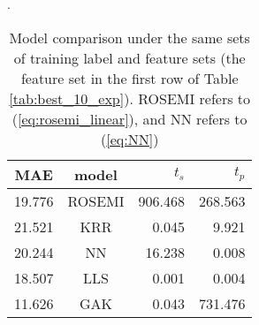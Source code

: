 \documentclass[12pt]{article}
\begin{document}
\begin{table}[H]
	\centering
	\caption{Model comparison under the same sets of training label and feature sets (the feature set in the first row of Table \ref{tab:best_10_exp}). ROSEMI refers to (\ref{eq:rosemi_linear}), and NN refers to (\ref{eq:NN})}.
	\begin{tabular}{|c|c|r|r|}
		\hline
		\textbf{MAE}	& \textbf{model}	& $t_s$	& $t_p$	\\ \hline
		19.776	& ROSEMI	& 906.468	& 268.563	\\ \hline
		21.521	& KRR	& 0.045	& 9.921	\\ \hline
		20.244	& NN	& 16.238	& 0.008	\\ \hline
		18.507	& LLS	& 0.001	& 0.004	\\ \hline
		11.626	& GAK	& 0.043	& 731.476	\\ \hline
	\end{tabular}
	\label{tab:model_comparison}
\end{table}
\end{document}
